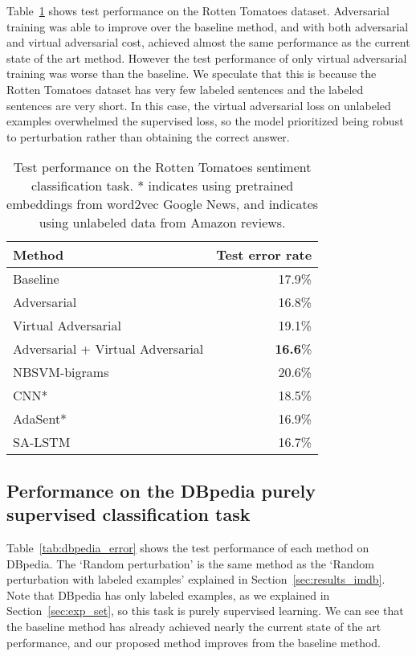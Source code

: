 \documentclass{article}
\begin{document}
Table~\ref{tab:rt_error} shows test performance on the Rotten Tomatoes dataset.
Adversarial training was able to improve over the baseline method, and
with both adversarial and virtual adversarial cost, achieved almost the same
performance as the current state of the art method.
However the test performance of only virtual adversarial training was worse
than the baseline.
We speculate that this is because the Rotten Tomatoes dataset has very few
labeled sentences and the labeled sentences are very short.
In this case, the virtual adversarial loss on unlabeled examples overwhelmed the supervised
loss, so the model prioritized being robust to perturbation rather than
obtaining the correct answer.

\begin{table}[ht]
  \centering
		\caption{\label{tab:rt_error}Test performance on the Rotten Tomatoes sentiment classification task. *
		indicates using pretrained embeddings from word2vec Google News,
		 and \textsuperscript{\textdagger} indicates using unlabeled data from Amazon reviews.}
\begin{tabular}{lr}
			\toprule
			\textbf{Method} & \textbf{Test error rate}\\
			\midrule
			Baseline & 17.9\%\\
			Adversarial & 16.8\% \\
			Virtual Adversarial & 19.1\% \\
			Adversarial + Virtual Adversarial & \textbf{16.6}\% \\
			\midrule
			NBSVM-bigrams\cite[]{wang2012baselines} & 20.6\% \\
			CNN*\cite[]{kim2014convolutional}& 18.5\% \\
			AdaSent*\cite[]{zhao2015self} & 16.9\% \\
			SA-LSTM\textsuperscript{\textdagger} \cite[]{dai2015semi} & 16.7\% \\
			\bottomrule
		\end{tabular}
\end{table}


\subsection{Performance on the DBpedia purely supervised classification task} 
Table~\ref{tab:dbpedia_error} shows the test performance of each method on DBpedia.
The `Random perturbation' is the same method as the `Random perturbation with labeled
examples' explained in Section~\ref{sec:results_imdb}. 
Note that DBpedia has only labeled examples, as we explained in
Section~\ref{sec:exp_set}, so this task is purely supervised learning.
We can see that the baseline method has already achieved nearly the current state
of the art performance, and our proposed method improves from the
baseline method.
\end{document}
